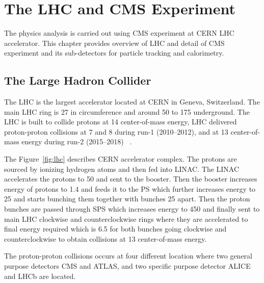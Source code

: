 \chapter{
  The LHC and CMS Experiment
 }\label{ch_cms}

The physics analysis is carried out using \gls{CMS} experiment at
\gls{CERN} \gls{LHC} accelerator. This chapter provides overview of \gls{LHC}
and detail of CMS experiment and its sub-detectors for particle tracking
and calorimetry.

\section{
  The Large Hadron Collider
 }\label{ch_cms:lhc}

The \gls{LHC} is the largest accelerator located at
\gls{CERN} in Geneva, Switzerland.
The main \gls{LHC} ring is 27\km{} in circumference
and around 50 to 175\m{} underground.
The \gls{LHC} is built to collide protons at 14\TeV{} center-of-mass energy,
LHC delivered proton-proton collisions at 7 and 8\TeV{}
during run-1 (2010--2012), and at 13\TeV{} center-of-mass energy during
run-2 (2015--2018)
~\cite{Evans:2008}.

The Figure~\ref{fig:lhc} describes \gls{CERN} accelerator complex.
The protons are sourced by ionizing hydrogen atoms
and then fed into \gls{LINAC}.
The \gls{LINAC} accelerates the protons to 50\MeV{} and sent to the booster.
Then the booster increases energy of protons to 1.4\GeV{} and
feeds it to the \gls{PS} which further increases energy to 25\GeV{}
and starts bunching them together with bunches 25\nanoseconds{} apart.
Then the proton bunches are passed through \gls{SPS} which increases energy
to 450\GeV{} and finally sent to main \gls{LHC} clockwise and counterclockwise
rings where they are accelerated to final energy required which is 6.5\TeV{}
for both bunches going clockwise and counterclockwise
to obtain collisions at 13\TeV{} center-of-mass energy.

The proton-proton collisions occurs at four different location where two
general purpose detectors \gls{CMS} and \gls{ATLAS}, and
two specific purpose detector \gls{ALICE} and \gls{LHCb} are located.

